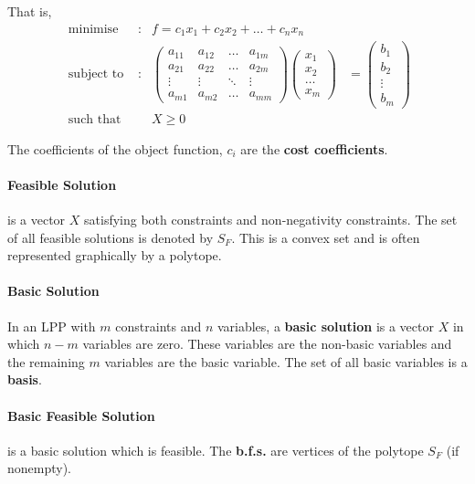 	That is,
\begin{align}
\text{ minimise } & : & f = c_1x_1 + c_2x_2 + \dots + c_nx_n & \\
\text{ subject to } & : & \begin{pmatrix} a_{11} & a_{12} & \dots & a_{1m} \\ a_{21} & a_{22} & \dots & a_{2m} \\ \vdots & \vdots & \ddots & \vdots \\ a_{m1} & a_{m2} & \dots & a_{mm} \end{pmatrix} \begin{pmatrix} x_1 \\ x_2 \\ \dots \\ x_m \end{pmatrix} & = \begin{pmatrix} b_1 \\ b_2 \\ \vdots \\ b_m \end{pmatrix} \\
\text{ such that } & & X \ge 0 &
\end{align}

	The coefficients of the object function, $c_i$ are the \textbf{cost coefficients}.

\paragraph{Feasible Solution} is a vector $X$ satisfying both constraints and non-negativity constraints. The set of all feasible solutions is denoted by $S_F$. This is a convex set and is often represented graphically by a polytope.

\paragraph{Basic Solution} In an LPP with $m$ constraints and $n$ variables, a \textbf{basic solution} is a vector $X$ in which $n-m$ variables are zero. These variables are the non-basic variables and the remaining $m$ variables are the basic variable. The set of all basic variables is a \textbf{basis}.

\paragraph{Basic Feasible Solution} is a basic solution which is feasible. The \textbf{b.f.s.} are vertices of the polytope $S_F$ (if nonempty).

